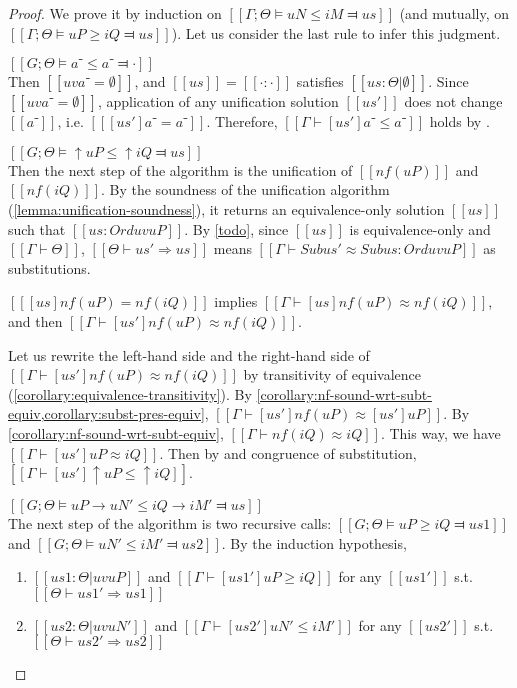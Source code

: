 \begin{proof}
    We prove it by induction on $[[Γ ; Θ ⊨ uN ≤ iM ⫤ us]]$ (and mutually, on $[[Γ ; Θ ⊨ uP ≥ iQ ⫤ us]]$).
    Let us consider the last rule to infer this judgment. 
    \begin{caseof}
        \item $[[G;Θ ⊨ a⁻ ≤ a⁻ ⫤ ·]]$\\
        Then $[[uv a⁻ = ∅]]$, and $[[us]] = [[· : ·]]$ satisfies $[[us : Θ|∅]]$.
        Since $[[uv a⁻ = ∅]]$, application of any unification solution $[[us']]$ does not change $[[a⁻]]$, i.e.
        $[[ [us']a⁻ = a⁻ ]]$. Therefore, $[[Γ ⊢ [us']a⁻ ≤ a⁻]]$ holds by .

        \item $[[G;Θ ⊨ ↑uP ≤ ↑iQ ⫤ us]]$\\
        Then the next step of the algorithm is the unification of $[[nf(uP)]]$ and $[[nf(iQ)]]$.
        By the soundness of the unification algorithm (\cref{lemma:unification-soundness}),
        it returns an equivalence-only solution $[[us]]$ such that $[[us : Ord uv uP]]$.
        By \cref{todo}, since $[[us]]$ is equivalence-only and $[[Γ ⊢ Θ]]$, $[[Θ ⊢ us' ⇒ us]]$ means 
        $[[ Γ ⊢ Sub us' ≈ Sub us : Ord uv uP ]]$ as substitutions.

        $[[ [us]nf(uP) = nf(iQ) ]]$ implies $[[Γ ⊢ [us]nf(uP) ≈ nf(iQ)]]$, and then 
        $[[Γ ⊢ [us']nf(uP) ≈ nf(iQ)]]$. 

        Let us rewrite the left-hand side and the right-hand side of $[[Γ ⊢ [us']nf(uP) ≈ nf(iQ)]]$ by 
        transitivity of equivalence (\cref{corollary:equivalence-transitivity}).
        By \cref{corollary:nf-sound-wrt-subt-equiv,corollary:subst-pres-equiv},
        $[[Γ ⊢ [us']nf(uP) ≈ [us']uP ]]$. By \cref{corollary:nf-sound-wrt-subt-equiv}, 
        $[[Γ ⊢ nf(iQ) ≈ iQ ]]$. 
        This way, we have $[[Γ ⊢ [us']uP ≈ iQ]]$.
        Then by 
        and congruence of substitution, $[[Γ ⊢ [us']↑uP ≤ ↑iQ]]$.

        \item $[[G;Θ ⊨ uP → uN' ≤ iQ → iM' ⫤ us]]$\\
        The next step of the algorithm is two recursive calls:
        $[[G;Θ ⊨ uP ≥ iQ ⫤ us1]]$ and $[[G;Θ ⊨ uN' ≤ iM' ⫤ us2]]$.
        By the induction hypothesis, 
        \begin{enumerate}
            \item $[[us1 : Θ | uv uP]]$ and $[[ Γ ⊢ [us1']uP ≥ iQ ]]$ for any $[[us1']]$ s.t. $[[Θ ⊢ us1' ⇒ us1]]$
            \item $[[us2 : Θ | uv uN']]$ and $[[ Γ ⊢ [us2']uN' ≤ iM' ]]$ for any $[[us2']]$ s.t. $[[Θ ⊢ us2' ⇒ us2]]$
        \end{enumerate}


\end{caseof}
\end{proof}
